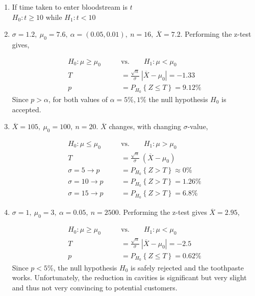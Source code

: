 \begin{enumerate}
	
	\item If time taken to enter bloodstream is $ t $ \\
	$ H_0 : t \geq 10 $ while $ H_1 : t < 10 $ \\
	
	\item $ \sigma = 1.2,\ \mu_0 = 7.6,\ \alpha = (0.05, 0.01),\ n = 16,\ \overline{X} = 7.2$. Performing the z-test gives,
	
		\begin{align}
			H_0 : \mu \geq \mu_0 \qquad &\text{vs.} \qquad H_1 : \mu < \mu_0 \nonumber \\
			T &= \frac{\sqrt{n}}{\sigma}\ |\overline{X} - \mu_0| = -1.33 \nonumber \\
			p &= P_{H_0}\left\{Z \leq T\right\} = 9.12\% 
		\end{align}
		Since $ p > \alpha $,  for both values of $ \alpha = 5\%, 1\% $ the null hypothesis $ H_0 $ is accepted.
	
	
	\item $ \overline{X} = 105,\ \mu_0 = 100,\ n = 20$. $ \overline{X} $ changes, with changing $ \sigma $-value,
	
		\begin{align}
			H_0 : \mu \leq \mu_0 \qquad &\text{vs.} \qquad H_1 : \mu > \mu_0 \nonumber \\
			T &= \frac{\sqrt{n}}{\sigma}\ (\overline{X} - \mu_0) \nonumber \\
			\sigma = 5 \to p &= P_{H_0}\left\{Z > T\right\} \approx 0\% \nonumber \\
			\sigma = 10 \to p &= P_{H_0}\left\{Z > T\right\} = 1.26\% \nonumber \\
			\sigma = 15 \to p &= P_{H_0}\left\{Z > T\right\} = 6.8\% 
		\end{align}
	
	
	\item $ \sigma = 1,\ \mu_0 = 3,\ \alpha = 0.05,\ n = 2500$. Performing the z-test gives $ \overline{X} = 2.95 $,
	
		\begin{align}
			H_0 : \mu \geq \mu_0 \qquad &\text{vs.} \qquad H_1 : \mu < \mu_0 \nonumber \\
			T &= \frac{\sqrt{n}}{\sigma}\ |\overline{X} - \mu_0| = -2.5 \nonumber \\
			p &= P_{H_0}\left\{Z \leq T\right\} = 0.62\% 
		\end{align}
		Since $ p < 5\% $, the null hypothesis $ H_0 $ is safely rejected and the toothpaste works.
		Unfortunately, the reduction in cavities is significant but very slight and thus not very convincing to potential customers.
	

\end{enumerate}
